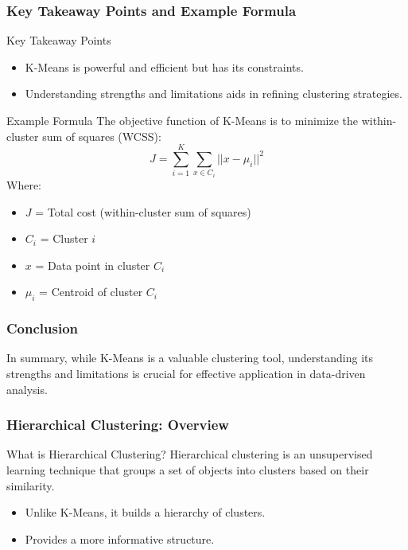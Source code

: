 \documentclass[aspectratio=169]{beamer}
\begin{document}
\begin{frame}[fragile]
    \frametitle{Key Takeaway Points and Example Formula}
    \begin{block}{Key Takeaway Points}
        \begin{itemize}
            \item K-Means is powerful and efficient but has its constraints.
            \item Understanding strengths and limitations aids in refining clustering strategies.
        \end{itemize}
    \end{block}
    
    \begin{block}{Example Formula}
        The objective function of K-Means is to minimize the within-cluster sum of squares (WCSS):
        \begin{equation}
        J = \sum_{i=1}^{K} \sum_{x \in C_i} ||x - \mu_i||^2 
        \end{equation}
        Where:
        \begin{itemize}
            \item \(J\) = Total cost (within-cluster sum of squares)
            \item \(C_i\) = Cluster \(i\)
            \item \(x\) = Data point in cluster \(C_i\)
            \item \(\mu_i\) = Centroid of cluster \(C_i\)
        \end{itemize}
    \end{block}
\end{frame}

\begin{frame}[fragile]
    \frametitle{Conclusion}
    In summary, while K-Means is a valuable clustering tool, understanding its strengths and limitations is crucial for effective application in data-driven analysis.
\end{frame}

\begin{frame}[fragile]
    \frametitle{Hierarchical Clustering: Overview}
    \begin{block}{What is Hierarchical Clustering?}
        Hierarchical clustering is an unsupervised learning technique that groups a set of objects into clusters based on their similarity.
        \begin{itemize}
            \item Unlike K-Means, it builds a hierarchy of clusters.
            \item Provides a more informative structure.
        \end{itemize}
    \end{block}
\end{frame}
\end{document}
